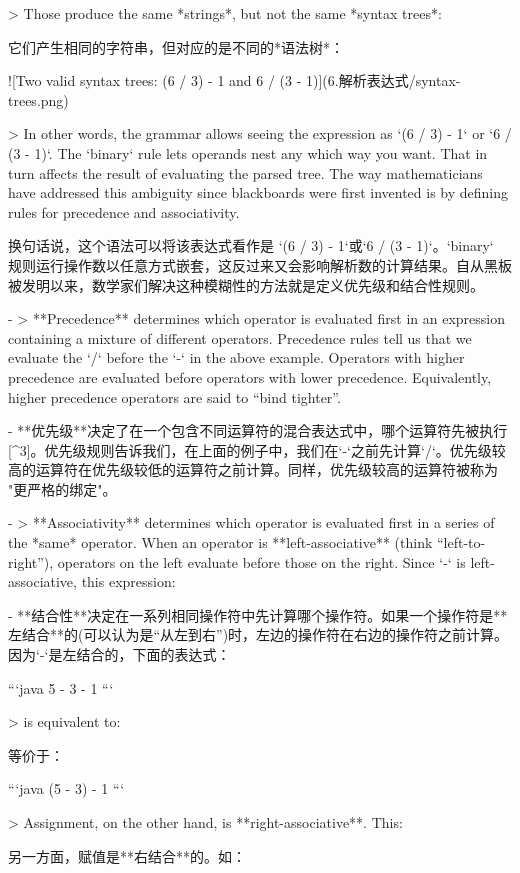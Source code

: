 \documentclass[cn,11pt,chinese]{elegantbook}
\begin{document}
> Those produce the same *strings*, but not the same *syntax trees*:

它们产生相同的字符串，但对应的是不同的*语法树*：

![Two valid syntax trees: (6 / 3) - 1 and 6 / (3 - 1)](6.解析表达式/syntax-trees.png)

> In other words, the grammar allows seeing the expression as `(6 / 3) - 1` or `6 / (3 - 1)`. The `binary` rule lets operands nest any which way you want. That in turn affects the result of evaluating the parsed tree. The way mathematicians have addressed this ambiguity since blackboards were first invented is by defining rules for precedence and associativity.

换句话说，这个语法可以将该表达式看作是 `(6 / 3) - 1`或`6 / (3 - 1)`。`binary` 规则运行操作数以任意方式嵌套，这反过来又会影响解析数的计算结果。自从黑板被发明以来，数学家们解决这种模糊性的方法就是定义优先级和结合性规则。

- > **Precedence** determines which operator is evaluated first in an expression containing a mixture of different operators. Precedence rules tell us that we evaluate the `/` before the `-` in the above example. Operators with higher precedence are evaluated before operators with lower precedence. Equivalently, higher precedence operators are said to “bind tighter”.

- **优先级**决定了在一个包含不同运算符的混合表达式中，哪个运算符先被执行[^3]。优先级规则告诉我们，在上面的例子中，我们在`-`之前先计算`/`。优先级较高的运算符在优先级较低的运算符之前计算。同样，优先级较高的运算符被称为 "更严格的绑定"。

- > **Associativity** determines which operator is evaluated first in a series of the *same* operator. When an operator is **left-associative** (think “left-to-right”), operators on the left evaluate before those on the right. Since `-` is left-associative, this expression:

- **结合性**决定在一系列相同操作符中先计算哪个操作符。如果一个操作符是**左结合**的(可以认为是“从左到右”)时，左边的操作符在右边的操作符之前计算。因为`-`是左结合的，下面的表达式：

  ```java
  5 - 3 - 1
  ```

  > is equivalent to:

  等价于：

  ```java
  (5 - 3) - 1
  ```

  > Assignment, on the other hand, is **right-associative**. This:

  另一方面，赋值是**右结合**的。如：
\end{document}
